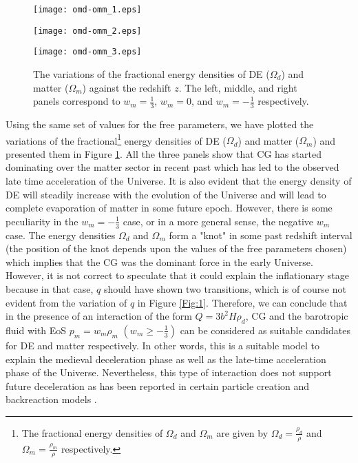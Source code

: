 \documentclass[two-column, nofootinbib]{revtex4-1}
\begin{document}
\begin{figure}[h]
\begin{center}
\begin{minipage}{0.3\textwidth}
\texttt{[image: omd-omm\_1.eps]}
\end{minipage}
\hspace*{0.25cm}
\begin{minipage}{0.3\textwidth}
\texttt{[image: omd-omm\_2.eps]}
\end{minipage}
\hspace*{0.25cm}
\begin{minipage}{0.3\textwidth}
\texttt{[image: omd-omm\_3.eps]}
\end{minipage}
\caption{The variations of the fractional energy densities of DE ($\Omega_d$) and matter ($\Omega_m$) against the redshift $z$. The left, middle, and right panels correspond to $w_m=\frac{1}{3}$, $w_m=0$, and $w_m=-\frac{1}{3}$ respectively.}
\label{Fig:2}
\end{center}
\end{figure}

Using the same set of values for the free parameters, we have plotted the variations of the fractional\footnote{The fractional energy densities of $\Omega_d$ and $\Omega_m$ are given by $\Omega_d=\frac{\rho_d}{\rho}$ and $\Omega_m=\frac{\rho_m}{\rho}$ respectively.} energy densities of DE ($\Omega_d$) and matter ($\Omega_m$) and presented them in Figure \ref{Fig:2}. All the three panels show that CG has started dominating over the matter sector in recent past which has led to the observed late time acceleration of the Universe. It is also evident that the energy density of DE will steadily increase with the evolution of the Universe and will lead to complete evaporation of matter in some future epoch. However, there is some peculiarity in the $w_m=-\frac{1}{3}$ case, or in a more general sense, the negative $w_m$ case. The energy densities $\Omega_d$ and $\Omega_m$ form a "knot" in some past redshift interval (the position of the knot depends upon the values of the free parameters chosen) which implies that the CG was the dominant force in the early Universe. However, it is not correct to speculate that it could explain the inflationary stage because in that case, $q$ should have shown two transitions, which is of course not evident from the variation of $q$ in Figure \ref{Fig:1}. Therefore, we can conclude that in the presence of an interaction of the form $Q=3b^2H\rho_d$, CG and the barotropic fluid with EoS $p_m=w_m\rho_m$ $\left(w_m \geq -\frac{1}{3}\right)$ can be considered as suitable candidates for DE and matter respectively. In other words, this is a suitable model to explain the medieval deceleration phase as well as the late-time acceleration phase of the Universe. Nevertheless, this type of interaction does not support future deceleration as has been reported in certain particle creation and backreaction models \cite{Bose1,Chakraborty1}. %
\end{document}
